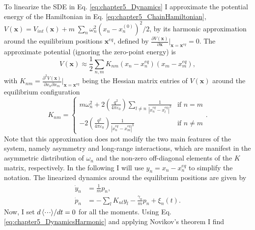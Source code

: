 To linearize the SDE in Eq. \eqref{eq:chapter5_Dynamics} I approximate the potential energy of the Hamiltonian in Eq. \eqref{eq:chapter5_ChainHamiltonian}, $V(\bm{x}) = V_{int}(\bm{x}) + m\;\sum_n \omega_n^2 (x_n-x_n^{(0)})^2/2$, by its harmonic approximation around the equilibrium positions $\bm{x}^{eq}$, defined by  $\frac{\partial V(\bm{x})}{\partial\bm{x}}\Big|_{\bm{x}=\bm{x}^{eq}} = 0$. The approximate potential (ignoring the zero-point energy) is
%
\begin{equation}
    V(\bm{x})\approx  \frac{1}{2} \sum_{n,m} K_{nm} (x_n-x_n^{eq})(x_m-x_m^{eq}),
\end{equation}
%
with $K_{nm} = \frac{\partial^2 V(\bm{x})}{\partial x_n \partial x_m}\Big|_{\bm{x}=\bm{x}^{eq}}$ being the Hessian matrix entries of $V(\bm{x})$ around the equilibrium configuration \cite{James1998}
%
\begin{equation}
    K_{nm} =
    \begin{cases}
        m \omega_n^2 + 2 \left(\frac{q^2}{4\pi\varepsilon_0}\right) \sum_{l \neq n  }\frac{1}{\left|x_n^{eq}-x_l^{eq}\right|^3} & \text{if  } n=m\\

         - 2 \left(\frac{q^2}{4\pi\varepsilon_0}\right) \frac{1}{\left|x_n^{eq}-x_m^{eq}\right|^3} & \text{if  } n \neq m
    \end{cases}.
\end{equation}
%
Note that this approximation does not modify the two main features of the system, namely asymmetry and long-range interactions, which are manifest in the asymmetric distribution of $\omega_n$ and the non-zero off-diagonal elements of the $K$ matrix, respectively. In the following I will use $y_n=x_n-x_n^{eq}$ to simplify the notation. The linearized dynamics around the equilibrium positions are given by
%
\begin{equation}
    \begin{split}
        \dot{y}_n &= \frac{1}{m}p_n,\\
        \dot{p}_n &= -\sum_{l}K_{nl}y_l- \frac{\gamma_n}{m}p_n + \xi_n(t).
    \end{split}
    \label{eq:chapter5_DynamicsHarmonic}
\end{equation}
%
Now, I set ${d\expval{\cdot\!\cdot\!\cdot}}/{dt} = 0$ for all the moments. Using Eq. \eqref{eq:chapter5_DynamicsHarmonic} and applying Novikov's theorem I find

